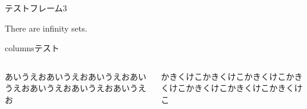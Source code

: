 \documentclass[unicode,11pt,t]{beamer}
\begin{document}
	\begin{frame}{テストフレーム3}
		\begin{theorem}
			There are infinity sets.
		\end{theorem}
	\end{frame}
	
	\begin{frame}{columnsテスト}
		\begin{columns}
			\begin{column}{0.475\textwidth}
				あいうえおあいうえおあいうえおあいうえおあいうえおあいうえおあいうえお
			\end{column}
			\begin{column}{0.475\textwidth}
				かきくけこかきくけこかきくけこかきくけこかきくけこかきくけこかきくけこ
			\end{column}
		\end{columns}
	\end{frame}
\end{document}
